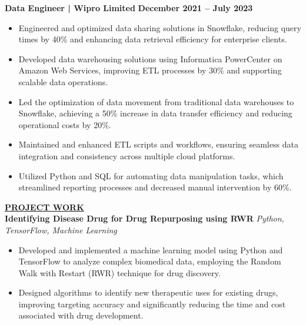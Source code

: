 \documentclass{article}
\begin{document}
\noindent \textbf{Data Engineer | Wipro Limited} \hfill \textbf{December 2021 – July 2023}
\begin{itemize}[noitemsep,nolistsep,leftmargin=*]
\item {\small Engineered and optimized data sharing solutions in Snowflake, reducing query times by 40\% and enhancing data retrieval efficiency for enterprise clients.}
\item {\small Developed data warehousing solutions using Informatica PowerCenter on Amazon Web Services, improving ETL processes by 30\% and supporting scalable data operations.}
\item {\small Led the optimization of data movement from traditional data warehouses to Snowflake, achieving a 50\% increase in data transfer efficiency and reducing operational costs by 20\%.}
\item {\small Maintained and enhanced ETL scripts and workflows, ensuring seamless data integration and consistency across multiple cloud platforms.}
\item {\small Utilized Python and SQL for automating data manipulation tasks, which streamlined reporting processes and decreased manual intervention by 60\%.}\\
\end{itemize}


%
%


\noindent \textbf{\underline{PROJECT WORK}} \\
\noindent \textbf{Identifying Disease Drug for Drug Repurposing using RWR} \textit{Python, TensorFlow, Machine Learning} \hfill \textbf{}
\begin{itemize}[noitemsep,nolistsep,leftmargin=*]
\item {\small Developed and implemented a machine learning model using Python and TensorFlow to analyze complex biomedical data, employing the Random Walk with Restart (RWR) technique for drug discovery.}
\item {\small Designed algorithms to identify new therapeutic uses for existing drugs, improving targeting accuracy and significantly reducing the time and cost associated with drug development.}
\end{itemize}
\end{document}
